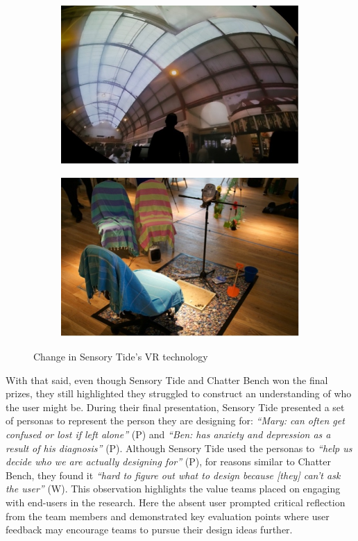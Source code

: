 \begin{figure}
\centering
\begin{subfigure}{.5\textwidth}
  \centering
  \includegraphics[width=.8\linewidth]{Images/DemVR/Findings/DomeProjection.jpg}
\end{subfigure}%
\begin{subfigure}{.5\textwidth}
  \centering
  \includegraphics[width=.8\linewidth]{Images/DemVR/Findings/SensoryTideDIY.jpg}
  \label{fig:senosryTideDIY}
\end{subfigure}
\caption{Change in Sensory Tide's VR technology}
\label{fig:SensoryTideDesignProcess}
\end{figure}

With that said, even though Sensory Tide and Chatter Bench won the final prizes, they still highlighted they struggled to construct an understanding of who the user might be. During their final presentation, Sensory Tide presented a set of personas to represent the person they are designing for: \textit{``Mary: can often get confused or lost if left alone''} (P) and \textit{``Ben: has anxiety and depression as a result of his diagnosis''} (P). Although Sensory Tide used the personas to \textit{``help us decide who we are actually designing for''} (P), for reasons similar to Chatter Bench, they found it \textit{``hard to figure out what to design because [they] can’t ask the user''} (W). This observation highlights the value teams placed on engaging with end-users in the research. Here the absent user prompted critical reflection from the team members and demonstrated key evaluation points where user feedback may encourage teams to pursue their design ideas further. 

